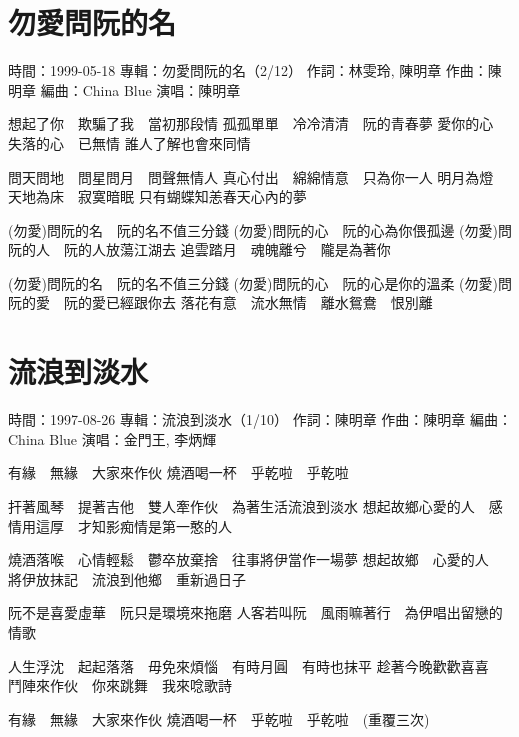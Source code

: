 \documentclass[UTF8,a4paper,oneside,twocolumn,12pt]{ctexbook}
\newcommand{\infopair}[2]{\textbullet #1：#2}
\newcommand{\zc}[1][伍佰]{\infopair{作詞}{#1}}
\newcommand{\zq}[1][伍佰]{\infopair{作曲}{#1}}
\newcommand{\bq}[1][伍佰]{\infopair{編曲}{#1}}
\newcommand{\zj}[1]{\infopair{專輯}{#1}}
\newcommand{\sj}[1]{\infopair{時間}{#1}}
\newenvironment{info}{\begin{flushleft}\kaishu
	}
	{\end{flushleft}\normalsize\yahei\par}
\newenvironment{lyric}{
	}
{}
\begin{document}
\section{勿愛問阮的名}
\begin{info}
	\sj{1999-05-18}
	\zj{勿愛問阮的名（2/12）}
	\zc[林雯玲, 陳明章]
	\zq[陳明章]
	\bq[China Blue]
	\infopair{演唱}{陳明章}
\end{info}
\begin{lyric}
	想起了你　欺騙了我　當初那段情
	孤孤單單　冷冷清清　阮的青春夢
	愛你的心　失落的心　已無情
	誰人了解也會來同情

	問天問地　問星問月　問聲無情人
	真心付出　綿綿情意　只為你一人
	明月為燈　天地為床　寂寞暗眠
	只有蝴蝶知恙春天心內的夢

	(勿愛)問阮的名　阮的名不值三分錢
	(勿愛)問阮的心　阮的心為你偎孤邊
	(勿愛)問阮的人　阮的人放蕩江湖去
	追雲踏月　魂魄離兮　隴是為著你

	(勿愛)問阮的名　阮的名不值三分錢
	(勿愛)問阮的心　阮的心是你的溫柔
	(勿愛)問阮的愛　阮的愛已經跟你去
	落花有意　流水無情　離水鴛鴦　恨別離
\end{lyric}

\section{流浪到淡水}
\begin{info}
	\sj{1997-08-26} %
	\zj{流浪到淡水（1/10）}
	\zc[陳明章]
	\zq[陳明章]
	\bq[China Blue]
	\infopair{演唱}{金門王, 李炳輝}
\end{info}
\begin{lyric}
	有緣　無緣　大家來作伙
	燒酒喝一杯　乎乾啦　乎乾啦

	扞著風琴　提著吉他　雙人牽作伙　為著生活流浪到淡水
	想起故鄉心愛的人　感情用這厚　才知影痴情是第一憨的人

	燒酒落喉　心情輕鬆　鬱卒放棄捨　往事將伊當作一場夢
	想起故鄉　心愛的人　將伊放抹記　流浪到他鄉　重新過日子

	阮不是喜愛虛華　阮只是環境來拖磨
	人客若叫阮　風雨嘛著行　為伊唱出留戀的情歌

	人生浮沈　起起落落　毋免來煩惱　有時月圓　有時也抹平
	趁著今晚歡歡喜喜　鬥陣來作伙　你來跳舞　我來唸歌詩

	有緣　無緣　大家來作伙
	燒酒喝一杯　乎乾啦　乎乾啦　(重覆三次)
\end{lyric}
\end{document}
